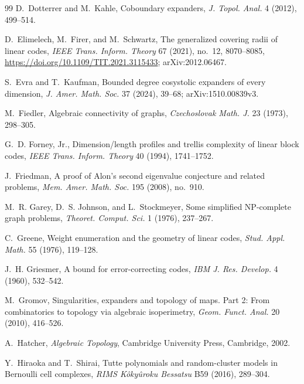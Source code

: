 \documentclass[11pt,letterpaper]{article}
\theoremstyle{plain}
\theoremstyle{definition}
\newcommand{\1}{\mathbf{1}}
\begin{document}
\begin{thebibliography}{99}
D.~Dotterrer and M.~Kahle,
\newblock Coboundary expanders,
\newblock \emph{J. Topol. Anal.} 4 (2012), 499--514.

D.~Elimelech, M.~Firer, and M.~Schwartz,
\newblock The generalized covering radii of linear codes,
\newblock \emph{IEEE Trans. Inform. Theory} 67 (2021), no.~12, 8070--8085,
\newblock \url{https://doi.org/10.1109/TIT.2021.3115433};
\newblock arXiv:2012.06467.

S.~Evra and T.~Kaufman,
\newblock Bounded degree cosystolic expanders of every dimension,
\newblock \emph{J. Amer. Math. Soc.} 37 (2024), 39--68;
\newblock arXiv:1510.00839v3.

M.~Fiedler,
\newblock Algebraic connectivity of graphs,
\newblock \emph{Czechoslovak Math. J.} 23 (1973), 298--305.

G.~D. Forney, Jr.,
\newblock Dimension/length profiles and trellis complexity of linear block codes,
\newblock \emph{IEEE Trans. Inform. Theory} 40 (1994), 1741--1752.

J.~Friedman,
\newblock A proof of Alon's second eigenvalue conjecture and related problems,
\newblock \emph{Mem. Amer. Math. Soc.} 195 (2008), no.~910.

M.~R. Garey, D.~S. Johnson, and L.~Stockmeyer,
\newblock Some simplified NP-complete graph problems,
\newblock \emph{Theoret. Comput. Sci.} 1 (1976), 237--267.

C.~Greene,
\newblock Weight enumeration and the geometry of linear codes,
\newblock \emph{Stud. Appl. Math.} 55 (1976), 119--128.

J.~H. Griesmer,
\newblock A bound for error-correcting codes,
\newblock \emph{IBM J. Res. Develop.} 4 (1960), 532--542.

M.~Gromov,
\newblock Singularities, expanders and topology of maps. Part 2: From combinatorics to
topology via algebraic isoperimetry,
\newblock \emph{Geom. Funct. Anal.} 20 (2010), 416--526.

A.~Hatcher,
\newblock \emph{Algebraic Topology},
\newblock Cambridge University Press, Cambridge, 2002.

Y.~Hiraoka and T.~Shirai,
\newblock Tutte polynomials and random-cluster models in Bernoulli cell complexes,
\newblock \emph{RIMS K\^oky\^uroku Bessatsu} B59 (2016), 289--304.


\end{thebibliography}
\end{document}
